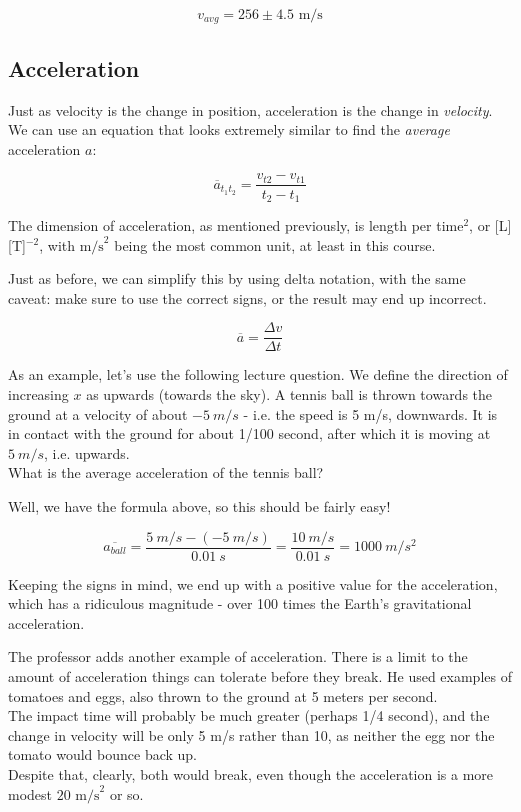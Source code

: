 \documentclass[8.01x]{subfiles}
\begin{document}
\begin{equation}
v_{avg} = 256 \pm 4.5 \text{ m/s}
\end{equation}

\subsection{Acceleration}

Just as velocity is the change in position, acceleration is the change in \emph{velocity}. We can use an equation that looks extremely similar to find the \emph{average} acceleration $a$:

\begingroup
\large
\begin{equation}
 \overbar{a}_{t_1 t_2} = \frac{v_{t2} - v_{t1}}{t_2 - t_1}
\end{equation}
\endgroup

The dimension of acceleration, as mentioned previously, is length per time${}^2$, or [L] [T]${}^{-2}$, with $\text{m/s}^2$ being the most common unit, at least in this course.

Just as before, we can simplify this by using delta notation, with the same caveat: make sure to use the correct signs, or the result may end up incorrect.

\begin{equation}
\overbar{a} = \frac{\Delta v}{\Delta t}
\end{equation}

As an example, let's use the following lecture question. We define the direction of increasing $x$ as upwards (towards the sky). A tennis ball is thrown towards the ground at a velocity of about $\SI{-5}{m/s}$ - i.e. the speed is 5 m/s, downwards. It is in contact with the ground for about 1/100 second, after which it is moving at $\SI{+5}{m/s}$, i.e. upwards.\\
What is the average acceleration of the tennis ball?

Well, we have the formula above, so this should be fairly easy!

\begin{equation}
 \overbar{a_{ball}} = \frac{\SI{5}{m/s} - (\SI{-5}{m/s})}{\SI{0.01}{s}} = \frac{\SI{10}{m/s}}{\SI{0.01}{s}} = \SI{1000}{m/s^2}
\end{equation}

Keeping the signs in mind, we end up with a positive value for the acceleration, which has a ridiculous magnitude - over 100 times the Earth's gravitational acceleration.

The professor adds another example of acceleration. There is a limit to the amount of acceleration things can tolerate before they break. He used examples of tomatoes and eggs, also thrown to the ground at 5 meters per second.\\
The impact time will probably be much greater (perhaps 1/4 second), and the change in velocity will be only 5 m/s rather than 10, as neither the egg nor the tomato would bounce back up.\\
Despite that, clearly, both would break, even though the acceleration is a more modest $20 \text{ m/s}^2$ or so.
\end{document}
